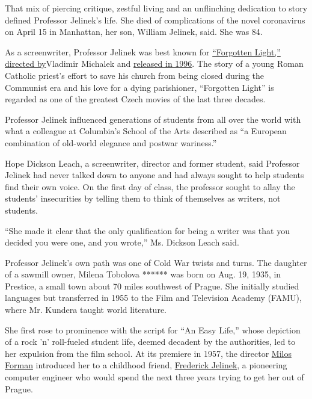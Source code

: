 That mix of piercing critique, zestful living and an unflinching
dedication to story defined Professor Jelinek's life. She died of
complications of the novel coronavirus on April 15 in Manhattan, her
son, William Jelinek, said. She was 84.

As a screenwriter, Professor Jelinek was best known for
\href{http://new-york.czechcentres.cz/program/event-details/forgotten-light/}{``Forgotten
Light,'' directed by}Vladimir Michalek and
\href{http://new-york.czechcentres.cz/program/event-details/forgotten-light/}{released
in 1996}. The story of a young Roman Catholic priest's effort to save
his church from being closed during the Communist era and his love for a
dying parishioner, ``Forgotten Light'' is regarded as one of the
greatest Czech movies of the last three decades.

Professor Jelinek influenced generations of students from all over the
world with what a colleague at Columbia's School of the Arts described
as ``a European combination of old-world elegance and postwar
wariness.''

Hope Dickson Leach, a screenwriter, director and former student, said
Professor Jelinek had never talked down to anyone and had always sought
to help students find their own voice. On the first day of class, the
professor sought to allay the students' insecurities by telling them to
think of themselves as writers, not students.

``She made it clear that the only qualification for being a writer was
that you decided you were one, and you wrote,'' Ms. Dickson Leach said.

Professor Jelinek's own path was one of Cold War twists and turns. The
daughter of a sawmill owner, Milena Tobolova ****** was born on Aug. 19,
1935, in Prestice, a small town about 70 miles southwest of Prague. She
initially studied languages but transferred in 1955 to the Film and
Television Academy (FAMU), where Mr. Kundera taught world literature.

She first rose to prominence with the script for ``An Easy Life,'' whose
depiction of a rock 'n' roll-fueled student life, deemed decadent by the
authorities, led to her expulsion from the film school. At its premiere
in 1957, the director
\href{https://www.nytimes3xbfgragh.onion/2018/04/14/obituaries/milos-forman-dead.html}{Milos
Forman} introduced her to a childhood friend,
\href{https://www.nytimes3xbfgragh.onion/2010/09/24/business/24jelinek.html}{Frederick
Jelinek}, a pioneering computer engineer who would spend the next three
years trying to get her out of Prague.

